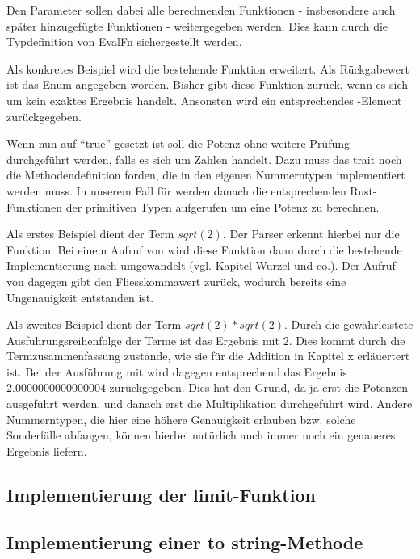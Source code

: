 \documentclass[11pt,a4paper, ngerman]{article}
\begin{document}
Den Parameter  sollen dabei alle berechnenden Funktionen - insbesondere auch später hinzugefügte Funktionen - weitergegeben werden. Dies kann durch die Typdefinition von EvalFn sichergestellt werden.

Als konkretes Beispiel wird die bestehende Funktion  erweitert. Als Rückgabewert ist das Enum  angegeben worden. Bisher gibt diese Funktion  zurück, wenn es sich um kein exaktes Ergebnis handelt. Ansonsten wird ein entsprechendes -Element zurückgegeben.

Wenn nun  auf ``true'' gesetzt ist soll die Potenz ohne weitere Prüfung durchgeführt werden, falls es sich um Zahlen handelt. Dazu muss das trait  noch die Methodendefinition  forden, die in den eigenen Nummerntypen implementiert werden muss. In unserem Fall für  werden danach die entsprechenden Rust-Funktionen der primitiven Typen aufgerufen um eine Potenz zu berechnen.

Als erstes Beispiel dient der Term $sqrt(2)$. Der Parser erkennt hierbei nur die Funktion. Bei einem Aufruf von  wird diese Funktion dann durch die bestehende Implementierung nach  umgewandelt (vgl. Kapitel Wurzel und co.). Der Aufruf von  dagegen gibt den Fliesskommawert  zurück, wodurch bereits eine Ungenauigkeit entstanden ist.

Als zweites Beispiel dient der Term $sqrt(2)*sqrt(2)$. Durch die gewährleistete Ausführungsreihenfolge der Terme ist das Ergebnis mit  $2$. Dies kommt durch die Termzusammenfassung zustande, wie sie für die Addition in Kapitel x erläuertert ist. Bei der Ausführung mit  wird dagegen entsprechend das Ergebnis $2.0000000000000004$ zurückgegeben. Dies hat den Grund, da ja erst die Potenzen ausgeführt werden, und danach erst die Multiplikation durchgeführt wird. Andere Nummerntypen, die hier eine höhere Genauigkeit erlauben bzw. solche Sonderfälle abfangen, können hierbei natürlich auch immer noch ein genaueres Ergebnis liefern.

\subsection{Implementierung der limit-Funktion}
\subsection{Implementierung einer to string-Methode}
\end{document}

